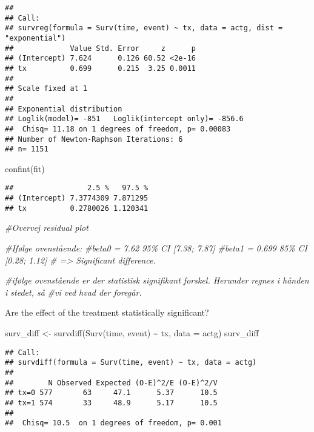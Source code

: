\documentclass[
]{article}
\newenvironment{Shaded}{\begin{snugshade}}{\end{snugshade}}
\newcommand{\AttributeTok}[1]{\textcolor[rgb]{0.77,0.63,0.00}{#1}}
\newcommand{\CommentTok}[1]{\textcolor[rgb]{0.56,0.35,0.01}{\textit{#1}}}
\newcommand{\FunctionTok}[1]{\textcolor[rgb]{0.00,0.00,0.00}{#1}}
\newcommand{\NormalTok}[1]{#1}
\newcommand{\OtherTok}[1]{\textcolor[rgb]{0.56,0.35,0.01}{#1}}
\newcommand{\SpecialCharTok}[1]{\textcolor[rgb]{0.00,0.00,0.00}{#1}}
\begin{document}
\begin{verbatim}
## 
## Call:
## survreg(formula = Surv(time, event) ~ tx, data = actg, dist = "exponential")
##             Value Std. Error     z      p
## (Intercept) 7.624      0.126 60.52 <2e-16
## tx          0.699      0.215  3.25 0.0011
## 
## Scale fixed at 1 
## 
## Exponential distribution
## Loglik(model)= -851   Loglik(intercept only)= -856.6
##  Chisq= 11.18 on 1 degrees of freedom, p= 0.00083 
## Number of Newton-Raphson Iterations: 6 
## n= 1151
\end{verbatim}

\begin{Shaded}
\begin{Highlighting}[]
\FunctionTok{confint}\NormalTok{(fit)}
\end{Highlighting}
\end{Shaded}

\begin{verbatim}
##                 2.5 %   97.5 %
## (Intercept) 7.3774309 7.871295
## tx          0.2780026 1.120341
\end{verbatim}

\begin{Shaded}
\begin{Highlighting}[]
\CommentTok{\#Overvej residual plot}

\CommentTok{\#Ifølge ovenstående:}
\CommentTok{\#beta0 = 7.62 95\% CI [7.38; 7.87]}
\CommentTok{\#beta1 = 0.699 85\% CI [0.28; 1.12]}
\CommentTok{\# =\textgreater{} Significant difference.}

\CommentTok{\#ifølge ovenstående er der statistisk signifikant forskel. Herunder regnes i hånden i stedet, så}
\CommentTok{\#vi ved hvad der foregår.}
\end{Highlighting}
\end{Shaded}

Are the effect of the treatment statistically significant?

\begin{Shaded}
\begin{Highlighting}[]
\NormalTok{surv\_diff }\OtherTok{\textless{}{-}} \FunctionTok{survdiff}\NormalTok{(}\FunctionTok{Surv}\NormalTok{(time, event) }\SpecialCharTok{\textasciitilde{}}\NormalTok{ tx, }\AttributeTok{data =}\NormalTok{ actg)}
\NormalTok{surv\_diff}
\end{Highlighting}
\end{Shaded}

\begin{verbatim}
## Call:
## survdiff(formula = Surv(time, event) ~ tx, data = actg)
## 
##        N Observed Expected (O-E)^2/E (O-E)^2/V
## tx=0 577       63     47.1      5.37      10.5
## tx=1 574       33     48.9      5.17      10.5
## 
##  Chisq= 10.5  on 1 degrees of freedom, p= 0.001
\end{verbatim}
\end{document}
